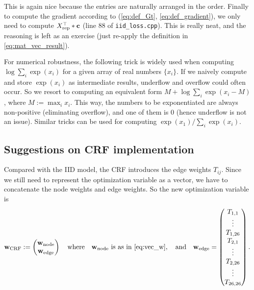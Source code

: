 \documentclass[11pt]{report}
\begin{document}
This is again nice because the entries are naturally arranged in the order.
Finally to compute the gradient according to (\ref{eq:def_Gt}, \ref{eq:def_gradient}),
we only need to compute $X_{\text{rep}}^\top * \mathbf{\boldsymbol{c}}$ (line 88 of \verb!iid_loss.cpp!).
This is really neat, and the reasoning is left as an exercise
(just re-apply the definition in \eqref{eq:mat_vec_result}).

For numerical robustness, the following trick is widely used when computing $\log \sum_i \exp(x_i)$ for a given array of real numbers $\{x_i\}$.  If we naively compute and store $\exp(x_i)$ as intermediate results, underflow and overflow could often occur.  So we resort to computing an equivalent form $M + \log \sum_i \exp(x_i - M)$, where $M := \max_i x_i$.  This way, the numbers to be exponentiated are always non-positive (eliminating overflow), and one of them is 0 (hence underflow is not an issue).  Similar tricks can be used for computing $\exp(x_1) / \sum_i \exp(x_i)$.


\subsection{Suggestions on CRF implementation}

Compared with the IID model,
the CRF introduces the edge weights $T_{ij}$.
Since we still need to represent the optimization variable as a vector, we have to concatenate the node weights and edge weights.
So the new optimization variable is
\begin{align}
\label{eq:wedges}
  {\mathbf{\boldsymbol{w}}_{\text{CRF}}} :=
  \begin{pmatrix}
    {\mathbf{\boldsymbol{w}}_{\text{node}}}\\
    {\mathbf{\boldsymbol{w}}_{\text{edge}}}
  \end{pmatrix}
  {\quad \text{where} \quad}
  {\mathbf{\boldsymbol{w}}_{\text{node}}} \text{ is as in \eqref{eq:vec_w}},
  \quad \text{and} \quad
  {\mathbf{\boldsymbol{w}}_{\text{edge}}} =
   \begin{pmatrix}
    T_{1,1} \\
    \vdots \\
    T_{1, 26} \\
    T_{2, 1} \\
    \vdots \\
    T_{2, 26} \\
    \vdots \\
    T_{26, 26}
  \end{pmatrix}.
\end{align}
\end{document}
